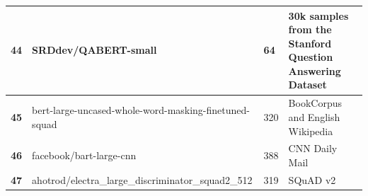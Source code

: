 \documentclass[11pt]{article}
\begin{document}
\begin{table}[htbp]
{\begin{tabular}{|l|l|l|l|}
\textbf{44} & SRDdev/QABERT-small  & 64 & 30k samples from the Stanford Question Answering Dataset \\ \hline
\textbf{45} & bert-large-uncased-whole-word-masking-finetuned-squad    & 320 & BookCorpus and English Wikipedia \\ \hline
\textbf{46} & facebook/bart-large-cnn  & 388 & CNN Daily Mail \\ \hline
\textbf{47} & ahotrod/electra\_large\_discriminator\_squad2\_512 & 319 & SQuAD v2 \\ \hline
\end{tabular}
}
\end{table}
\end{document}
